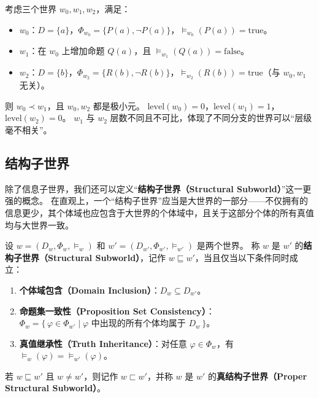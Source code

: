 \begin{example}\label{ex:level}
    考虑三个世界 $w_0, w_1, w_2$，满足：
    \begin{itemize}
        \item $w_0$：$D=\{a\}$，$\Phi_{w_0} = \{P(a), \neg P(a)\}$，$\models_{w_0}(P(a))=\text{true}$。
        \item $w_1$：在 $w_0$ 上增加命题 $Q(a)$，且 $\models_{w_1}(Q(a))=\text{false}$。
        \item $w_2$：$D=\{b\}$，$\Phi_{w_2} = \{R(b), \neg R(b)\}$，$\models_{w_2}(R(b))=\text{true}$（与 $w_0, w_1$ 无关）。
    \end{itemize}
    则 $w_0 \prec w_1$，且 $w_0, w_2$ 都是极小元。
    $\mathrm{level}(w_0)=0$，$\mathrm{level}(w_1)=1$，$\mathrm{level}(w_2)=0$。
    $w_1$ 与 $w_2$ 层数不同且不可比，体现了不同分支的世界可以“层级毫不相关”。
\end{example}

\subsection{结构子世界}\label{subsec:subworld}
除了信息子世界，我们还可以定义“\textbf{结构子世界（Structural Subworld）}”这一更强的概念。
在直观上，一个“结构子世界”应当是大世界的一部分——不仅拥有的信息更少，其个体域也应包含于大世界的个体域中，且关于这部分个体的所有真值均与大世界一致。

\begin{definition}[结构子世界]\label{def:subworld}
    设 $w = (D_w, \Phi_w, \models_w)$ 和 $w' = (D_{w'}, \Phi_{w'}, \models_{w'})$ 是两个世界。
    称 $w$ 是 $w'$ 的\textbf{结构子世界（Structural Subworld）}，记作 $w \sqsubseteq w'$，当且仅当以下条件同时成立：
    \begin{enumerate}
        \item \textbf{个体域包含（Domain Inclusion）}：$D_w \subseteq D_{w'}$。
        \item \textbf{命题集一致性（Proposition Set Consistency）}：$\Phi_w = \{\, \varphi \in \Phi_{w'} \mid \text{$\varphi$ 中出现的所有个体均属于 } D_w \,\}$。
        \item \textbf{真值继承性（Truth Inheritance）}：对任意 $\varphi \in \Phi_w$，有 $\models_w(\varphi) = \models_{w'}(\varphi)$。
    \end{enumerate}
    若 $w \sqsubseteq w'$ 且 $w \neq w'$，则记作 $w \sqsubset w'$，并称 $w$ 是 $w'$ 的\textbf{真结构子世界（Proper Structural Subworld）}。
\end{definition}


